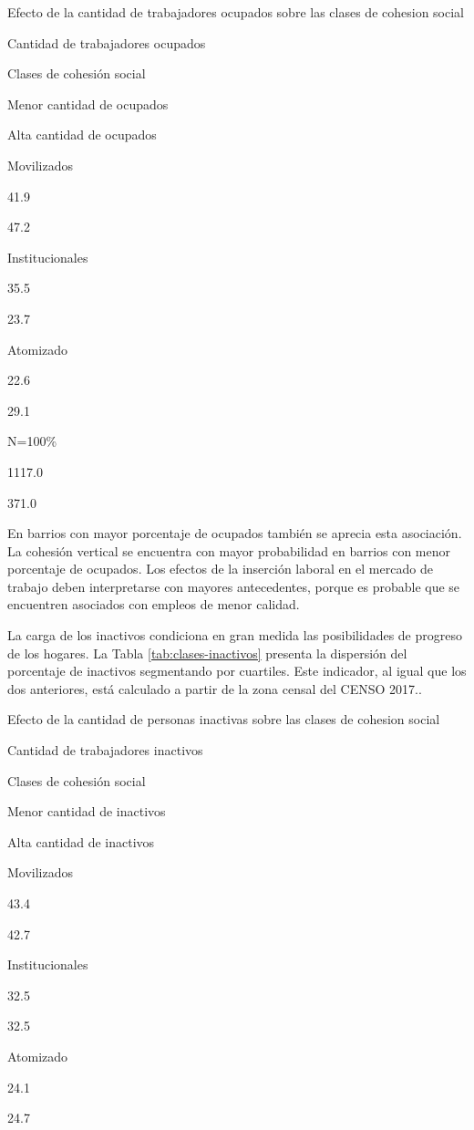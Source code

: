 \documentclass[
  12pt,
]{book}
\begin{document}
\label{tab:clases-ocupados}Efecto de la cantidad de trabajadores ocupados sobre las clases de cohesion social

Cantidad de trabajadores ocupados

Clases de cohesión social

Menor cantidad de ocupados

Alta cantidad de ocupados

Movilizados

41.9

47.2

Institucionales

35.5

23.7

Atomizado

22.6

29.1

N=100\%

1117.0

371.0

En barrios con mayor porcentaje de ocupados también se aprecia esta asociación. La cohesión vertical se encuentra con mayor probabilidad en barrios con menor porcentaje de ocupados. Los efectos de la inserción laboral en el mercado de trabajo deben interpretarse con mayores antecedentes, porque es probable que se encuentren asociados con empleos de menor calidad.

La carga de los inactivos condiciona en gran medida las posibilidades de progreso de los hogares. La Tabla \ref{tab:clases-inactivos} presenta la dispersión del porcentaje de inactivos segmentando por cuartiles. Este indicador, al igual que los dos anteriores, está calculado a partir de la zona censal del CENSO 2017..

\label{tab:clases-inactivos}Efecto de la cantidad de personas inactivas sobre las clases de cohesion social

Cantidad de trabajadores inactivos

Clases de cohesión social

Menor cantidad de inactivos

Alta cantidad de inactivos

Movilizados

43.4

42.7

Institucionales

32.5

32.5

Atomizado

24.1

24.7
\end{document}
